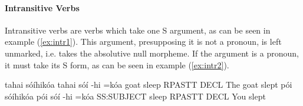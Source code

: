 \documentclass[a4paper, 12pt, oneside]{memoir}
\begin{document}
\begin{comment}
\begin{table}[H]
    \centering
    \begin{tabular}{@{}llll@{}}
    \toprule
    \multicolumn{2}{c}{Class}                     & \multicolumn{1}{c}{Number of Arguments} & \multicolumn{1}{c}{Argument Marking} \\ \midrule
    Intransitive        &                         & 1                                       & S-∅ V                                \\
    Ext. Intransitive   &                         & 2                                       & S-∅ V E-{\Dat}/{\Loc}                      \\
    Transitive          & a) Core Transitives     & 2                                       & A-{\Erg} V P-∅                          \\
                        & b) Non-Core Transitives & 2                                       & A-{\Erg} V P-\textsc{ncore}                      \\
    Pos. Compound Verbs &                         & 1-2                                     & S-∅ V or A-{\Erg} V P-∅                 \\
    Ditransitive        &                         & 3                                       & D-{\Erg} T-∅ V R-{\Dat}                    \\ \bottomrule
    \end{tabular}
    \caption{Verb Classes Overview}
    \label{t:verbclass}
    \end{table}
\end{comment}
\paragraph{Intransitive Verbs}
Intransitive verbs are verbs which take one S argument, as can be seen in example (\ref{ex:intr1}). This argument, presupposing it is not a pronoun, is left unmarked, i.e. takes the absolutive null morpheme. If the argument is a pronoun, it must take its S form, as can be seen in example (\ref{ex:intr2}).
\begin{examples}
    \ex \label{ex:intr1}
    \words tahai sóíhikóa
    \bits tahai sóí -hi =kóa
    \gloss goat sleep RPASTT DECL
    \tr The goat slept
    \ex \label{ex:intr2}
    \words pói sóíhikóa
    \bits pói sóí -hi =kóa
    \gloss SS:SUBJECT sleep RPASTT DECL 
    \tr You slept
\end{examples}
\end{document}
